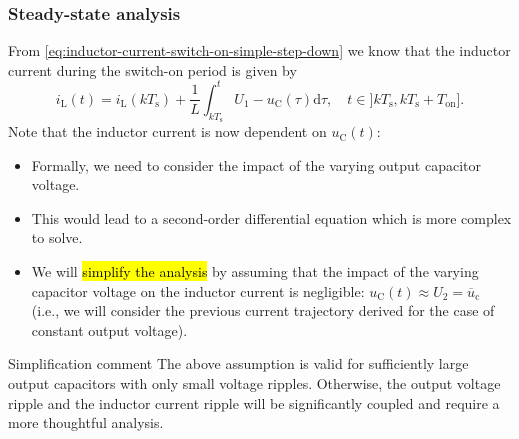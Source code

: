 \begin{frame}
	\frametitle{Steady-state analysis}
	From \eqref{eq:inductor-current-switch-on-simple-step-down} we know that the inductor current during the switch-on period is given by
	\begin{equation*}
		i_\mathrm{L}(t) = i_\mathrm{L}(k T_\mathrm{s}) + \frac{1}{L}\int_{k T_\mathrm{s}}^{t}U_1-u_\mathrm{C}(\tau) \mathrm{d}\tau , \quad t\in ]k T_\mathrm{s}, k T_\mathrm{s} + T_\mathrm{on}].
	\end{equation*}
	\pause
	Note that the inductor current is now dependent on $u_\mathrm{C}(t)$:
	\begin{itemize}
		\item Formally, we need to consider the impact of the varying output capacitor voltage. \pause
		\item This would lead to a second-order differential equation which is more complex to solve. \pause
		\item We will \hl{simplify the analysis} by assuming that the impact of the varying capacitor voltage on the inductor current is negligible: $u_\mathrm{C}(t) \approx U_2=\overline{u}_\mathrm{c}$ (i.e., we will consider the previous current trajectory derived for the case of constant output voltage). \pause
	\end{itemize}
	\vspace{-0.5cm}
	\begin{varblock}{Simplification comment}
		The above assumption is valid for sufficiently large output capacitors with only small voltage ripples. Otherwise, the output voltage ripple and the inductor current ripple will be significantly coupled and require a more thoughtful analysis.
	\end{varblock}
\end{frame}

